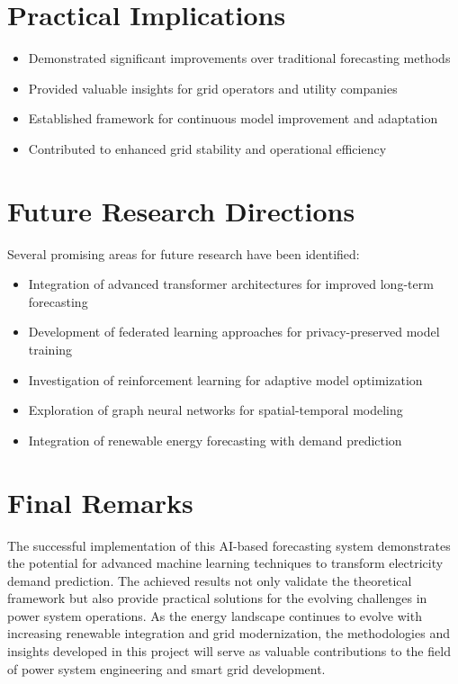 \documentclass[12pt,a4paper]{report}
\begin{document}
\section{Practical Implications}
\begin{itemize}
\item Demonstrated significant improvements over traditional forecasting methods
\item Provided valuable insights for grid operators and utility companies
\item Established framework for continuous model improvement and adaptation
\item Contributed to enhanced grid stability and operational efficiency
\end{itemize}

\section{Future Research Directions}
Several promising areas for future research have been identified:

\begin{itemize}
\item Integration of advanced transformer architectures for improved long-term forecasting
\item Development of federated learning approaches for privacy-preserved model training
\item Investigation of reinforcement learning for adaptive model optimization
\item Exploration of graph neural networks for spatial-temporal modeling
\item Integration of renewable energy forecasting with demand prediction
\end{itemize}

\section{Final Remarks}
The successful implementation of this AI-based forecasting system demonstrates the potential for advanced machine learning techniques to transform electricity demand prediction. The achieved results not only validate the theoretical framework but also provide practical solutions for the evolving challenges in power system operations. As the energy landscape continues to evolve with increasing renewable integration and grid modernization, the methodologies and insights developed in this project will serve as valuable contributions to the field of power system engineering and smart grid development.
\end{document}
